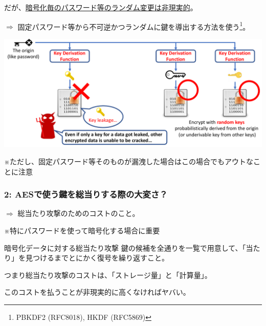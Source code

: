 \documentclass[12pt,dvipdfmx]{beamer}
\begin{document}
\begin{frame}
だが、\underline{暗号化毎のパスワード等のランダム変更は非現実的}。

\vspace{2ex}

$\Rightarrow$ \alert{固定パスワード等から不可逆かつランダムに鍵を導出する方法}を使う\footnote[frame]{PBKDF2 (RFC8018), HKDF (RFC5869)}。

\begin{center}
\includegraphics[width=0.9\linewidth]{Figs/pfs_kdf_case.pdf}
\end{center}

※ただし、固定パスワード等そのものが漏洩した場合はこの場合でもアウトなことに注意
\end{frame}

\begin{frame}
\frametitle{2: AESで使う鍵を総当りする際の大変さ？}

$\Rightarrow$ 総当たり攻撃のためのコストのこと。

\alert{※特にパスワードを使って暗号化する場合に重要}

\vspace{1ex}

\begin{block}{\small 暗号化データに対する総当たり攻撃}
鍵の候補を全通りを一覧で用意して、「当たり」を見つけるまでとにかく復号を繰り返すこと。
\end{block}

\vspace{2ex}

つまり総当たり攻撃のコストは、「ストレージ量」と「計算量」。

\alert{このコストを払うことが非現実的に高くなければヤバい。}
\end{frame}
\end{document}

